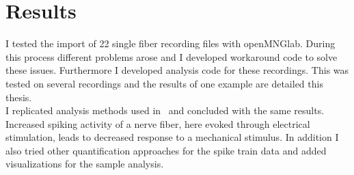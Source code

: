 \section{Results}
I tested the import of 22 single fiber recording files with openMNGlab. During this process different problems arose and I developed workaround code to solve these issues. Furthermore I developed analysis code for these recordings. This was tested on several recordings and the results of one example are detailed this thesis.\\
I replicated analysis methods used in~\cite{roberto} and concluded with the same results. Increased spiking activity of a nerve fiber, here evoked through electrical stimulation, leads to decreased response to a mechanical stimulus. In addition I also tried other quantification approaches for the spike train data and added visualizations for the sample analysis.

